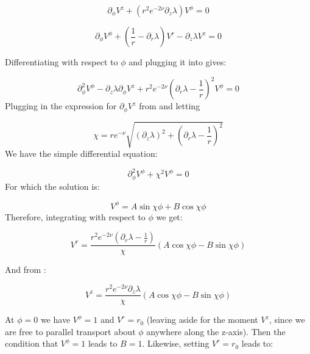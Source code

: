 \documentclass{article}
\begin{document}
\begin{equation}
\label{eq:V_z-V_phi}
\partial_{\phi}V^{z}+\left(r^{2}e^{-2\nu}\partial_{z}\lambda\right)V^{\phi}=0
\end{equation}

\begin{equation}
\partial_{\phi}V^{\phi}+\left(\frac{1}{r}-\partial_{r}\lambda\right)V^{r}-\partial_{z}\lambda V^{z}=0\label{eq:V-phi-r-z}
\end{equation}

Differentiating  with respect to $\phi$ and plugging it into  gives:

\begin{equation}
\partial^{2}_{\phi}V^{\phi}-\partial_z\lambda\partial_{\phi}V^z+r^{2}e^{-2\nu}\left(\partial_r\lambda-\frac{1}{r}\right)^2V^{\phi}=0
\end{equation}
Plugging in the expression for $\partial_{\phi}V^z$ from
 and letting 

\begin{equation}
\label{eq:def-chi}
\chi=re^{-\nu}\sqrt{\left(\partial_z\lambda\right)^2+\left(\partial_r\lambda-\frac{1}{r}\right)^2}
\end{equation}
We have the simple differential equation:

\begin{equation}
\partial^2_\phi V^\phi+\chi^2 V^\phi=0
\end{equation}
For which the solution is:

\begin{equation}
V^{\phi}=A\sin\chi\phi+B\cos\chi\phi
\end{equation}
Therefore, integrating  with respect to $\phi$ we get:

\begin{equation}
V^{r}=\frac{r^2e^{-2\nu}(\partial_r\lambda-\frac{1}{r})}{\chi}\left(A\cos\chi\phi-B\sin\chi\phi\right)
\end{equation}

And from :

\begin{equation}
V^{z}=\frac{r^2 e^{-2\nu}\partial_z\lambda}{\chi}\left(A\cos\chi\phi-B\sin\chi\phi\right)
\end{equation}

At $\phi=0$ we have $V^\phi=1$ and $V^r=r_0$ (leaving aside for the
moment $V^z$, since we are free to parallel transport about $\phi$
anywhere along the z-axis). Then the condition that $V^\phi=1$ leads to
$B=1$. Likewise, setting $V^r=r_0$ leads to:
\end{document}
